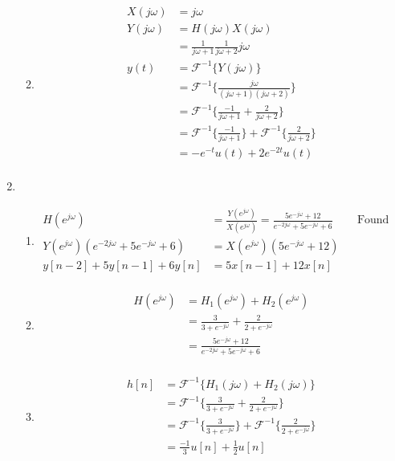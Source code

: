 \documentclass[10pt,a4paper, margin=1in]{article}
\begin{document}
\begin{enumerate}
\begin{enumerate}
\begin{align*}
    \end{align*}
	\item %
    \begin{align*}
        X(j\omega) &= j\omega \\
        Y(j\omega) &= H(j\omega)X(j\omega) \\
        &= \frac{1}{j\omega + 1}\frac{1}{j\omega + 2}j\omega \\
        y(t) &= \mathcal{F}^{-1}\{Y(j\omega)\} \\
        &= \mathcal{F}^{-1}\{\frac{j\omega}{(j\omega + 1)(j\omega + 2)}\} \\
        &= \mathcal{F}^{-1}\{\frac{-1}{j\omega + 1} + \frac{2}{j\omega + 2}\} \\
        &= \mathcal{F}^{-1}\{\frac{-1}{j\omega + 1}\} + \mathcal{F}^{-1}\{\frac{2}{j\omega + 2}\} \\
        &= -e^{-t}u(t) + 2e^{-2t}u(t) \\
    \end{align*}
    \end{enumerate}

\item %
    \begin{enumerate}   
    \item \begin{align*}
    H(e^{j\omega}) & = \frac{Y(e^{j\omega})}{X(e^{j\omega})} = \frac{5e^{-j\omega} + 12}{e^{-2j\omega}+5e^{-j\omega}+6} && \text{Found in part 4b} \\
        Y(e^{j\omega})(e^{-2j\omega}+5e^{-j\omega}+6) &= X(e^{j\omega})(5e^{-j\omega} + 12) \\
        y[n-2] + 5y[n-1] + 6y[n] &= 5x[n-1] + 12x[n] \\
    \end{align*}
    \item \begin{align*}
        H(e^{j\omega}) &= H_1(e^{j\omega}) + H_2(e^{j\omega}) \\
        &= \frac{3}{3+e^{-j\omega}} + \frac{2}{2+e^{-j\omega}} \\
        &= \frac{5e^{-j\omega} + 12}{e^{-2j\omega}+5e^{-j\omega}+6} \\
    \end{align*}
	\item \begin{align*}
        h[n] &= \mathcal{F}^{-1}\{H_1(j\omega) + H_2(j\omega)\}\\
        &= \mathcal{F}^{-1}\{\frac{3}{3+e^{-j\omega}} + \frac{2}{2+e^{-j\omega}}\}\\
        &= \mathcal{F}^{-1}\{\frac{3}{3+e^{-j\omega}}\} + \mathcal{F}^{-1}\{\frac{2}{2+e^{-j\omega}}\}\\
        &= \frac{-1}{3} u[n] + \frac{1}{2} u[n] \\
    \end{align*}
    \end{enumerate}


\end{enumerate}
\end{document}
